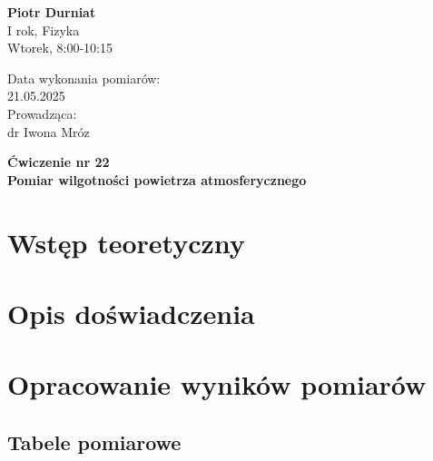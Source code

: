 \documentclass[a4paper,12pt]{article}
\begin{document}
\noindent
\begin{minipage}{0.5\textwidth}
    \raggedright
    \textbf{Piotr Durniat} \\
    I rok, Fizyka \\
    Wtorek, 8:00-10:15 \\
    \vspace{0.5cm}
    \vspace{0.5cm}
\end{minipage}%
\begin{minipage}{0.5\textwidth}
    \raggedleft
    Data wykonania pomiarów: \\
    21.05.2025 \\
    \vspace{0.5cm}
    Prowadząca: \\
    dr Iwona Mróz
\end{minipage}

\vspace{2cm}
\begin{center}
    \LARGE \textbf{Ćwiczenie nr 22} \\[0.5cm]
    \Large \textbf{Pomiar wilgotności powietrza atmosferycznego}
\end{center}

\vspace{1cm} %
\noindent

\tableofcontents
\newpage

\section{Wstęp teoretyczny}

\section{Opis doświadczenia}

\section{Opracowanie wyników pomiarów}

\subsection{Tabele pomiarowe}
\end{document}
